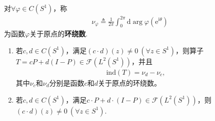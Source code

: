 \documentclass[../../main.tex]{subfiles}%
\begin{document}
\begin{definition}[环绕数]
对$\forall\varphi\in C(S^1)$，称
\begin{align*}
\nu_\varphi\triangleq\frac{1}{2\pi}\int_{0}^{2\pi}\mathrm{d}\arg\varphi(\mathrm{e}^{\mathrm{i}\theta})
\end{align*}
为函数$\varphi$关于原点的\textbf{环绕数}.
\end{definition}

\begin{theorem}
\begin{enumerate}[(1)]
\item 若$c,d \in C(S^1)$，满足$(c\cdot d)(z) \neq 0\ (\forall z \in S^1)$，则算子$T = cP + d(I-P) \in \mathscr{F}(L^2(S^1))$，并且
\begin{align*}
\mathrm{ind}(T) = \nu_d - \nu_c,
\end{align*}
其中$\nu_c$和$\nu_d$分别是函数$c$和$d$关于原点的环绕数。

\item 若$c,d \in C(S^1)$，满足$c\cdot P + d\cdot(I-P) \in \mathscr{F}(L^2(S^1))$，则$(c\cdot d)(z) \neq 0\ (\forall z \in S^1)$.
\end{enumerate}
\end{theorem}
\end{document}
